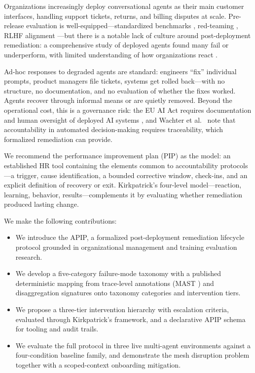 \documentclass[conference]{IEEEtran}
\begin{document}
Organizations increasingly deploy conversational agents as their main customer
interfaces, handling support tickets, returns, and billing disputes at scale.
Pre-release evaluation is well-equipped---standardized benchmarks
\cite{liang2022}, red-teaming \cite{ganguli2022}, RLHF alignment
\cite{ouyang2022}---but there is a notable lack of culture around
post-deployment remediation: a comprehensive study of deployed agents found
many fail or underperform, with limited understanding of how organizations
react \cite{pan2025}.

Ad-hoc responses to degraded agents are standard: engineers ``fix'' individual
prompts, product managers file tickets, systems get rolled back---with no
structure, no documentation, and no evaluation of whether the fixes worked.
Agents recover through informal means or are quietly removed. Beyond the
operational cost, this is a governance risk: the EU AI Act requires
documentation and human oversight of deployed AI systems \cite{euaiact}, and
Wachter et al.\ \cite{wachter2017} note that accountability in automated
decision-making requires traceability, which formalized remediation can provide.

We recommend the performance improvement plan (PIP) as the model: an
established HR tool containing the elements common to accountability
protocols---a trigger, cause identification, a bounded corrective window,
check-ins, and an explicit definition of recovery or exit. Kirkpatrick's
\cite{kirkpatrick1994} four-level model---reaction, learning, behavior,
results---complements it by evaluating whether remediation produced lasting
change.

We make the following contributions:

\begin{itemize}
  \item We introduce the APIP, a formalized post-deployment remediation
  lifecycle protocol grounded in organizational management and training
  evaluation research.

  \item We develop a five-category failure-mode taxonomy with a published
  deterministic mapping from trace-level annotations (MAST \cite{cemri2025}) and
  disaggregation signatures onto taxonomy categories and intervention tiers.

  \item We propose a three-tier intervention hierarchy with escalation
  criteria, evaluated through Kirkpatrick's framework, and a declarative APIP
  schema for tooling and audit trails.

  \item We evaluate the full protocol in three live multi-agent environments
  against a four-condition baseline family, and demonstrate the mesh disruption
  problem together with a scoped-context onboarding mitigation.
\end{itemize}
\end{document}
